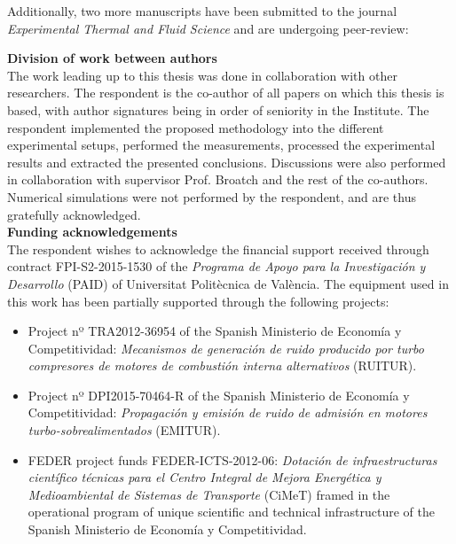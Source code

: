 \documentclass[final,twoside,11pt]{book}
\numberwithin{equation}{section}
\numberwithin{figure}{chapter}
\numberwithin{table}{chapter}
\begin{document}
Additionally, two more manuscripts have been submitted to the journal \emph{Experimental Thermal and Fluid Science} and are undergoing peer-review:

\begingroup
{}
\nocite{torregrosa2016local,torregrosa2016measuring}
\printbibliography[keyword=MyOwnSub,heading=none]
\endgroup

\newpage

{\bfseries\sffamily\Large\noindent Division of work between authors}\\[-1mm]

\noindent The work leading up to this thesis was done in collaboration with other researchers. The respondent is the co-author of all papers on which this thesis is based, with author signatures being in order of seniority in the Institute. The respondent implemented the proposed methodology into the different experimental setups, performed the measurements, processed the experimental results and extracted the presented conclusions. Discussions were also performed in collaboration with supervisor Prof. Broatch and the rest of the co-authors. Numerical simulations were not performed by the respondent, and are thus gratefully acknowledged.\\[2mm]

{\bfseries\sffamily\Large\noindent Funding acknowledgements}\\[-1mm]

\noindent The respondent wishes to acknowledge the financial support received through contract FPI-S2-2015-1530 of the \emph{Programa de Apoyo para la Investigación y Desarrollo} (PAID) of Universitat Politècnica de València. The equipment used in this work has been partially supported through the following projects:

\begin{itemize}
  \item Project nº TRA2012-36954 of the Spanish Ministerio de Economía y Competitividad: \emph{Mecanismos de generación de ruido producido por turbo compresores de motores de combustión interna alternativos} (RUITUR).

  \item Project nº DPI2015-70464-R of the Spanish Ministerio de Economía y Competitividad: \emph{Propagación y emisión de ruido de admisión en motores turbo-sobrealimentados} (EMITUR).

  \item FEDER project funds FEDER-ICTS-2012-06: \emph{Dotación de infraestructuras científico técnicas para el Centro Integral de Mejora Energética y Medioambiental de Sistemas de Transporte} (CiMeT) framed in the operational program of unique scientific and technical infrastructure of the Spanish Ministerio de Economía y Competitividad.
\end{itemize}
\end{document}
